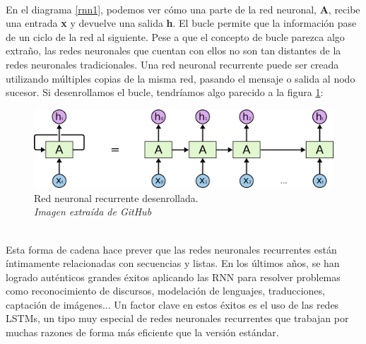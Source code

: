 \\En el diagrama \ref{rnn1}, podemos ver cómo una parte de la red neuronal, \textbf{A}, recibe una entrada \textbf{x} y devuelve una salida \textbf{h}. El bucle permite que la información pase de un ciclo de la red al siguiente. Pese a que el concepto de bucle parezca algo extraño, las redes neuronales que cuentan con ellos no son tan distantes de la redes neuronales tradicionales. Una red neuronal recurrente puede ser creada utilizando múltiples copias de la misma red, pasando el mensaje o salida al nodo sucesor. Si desenrollamos el bucle, tendríamos algo parecido a la figura \ref{rnn2}:\\
\begin{figure}[htp]
\centering
\vspace{-1.5em}
\includegraphics[scale=0.3]{images/RNNunrolled.png}
\caption{Red neuronal recurrente desenrollada.\\\textit{Imagen extraída de GitHub}}
\label{rnn2}
\end{figure}
\\Esta forma de cadena hace prever que las redes neuronales recurrentes están íntimamente relacionadas con secuencias y listas. En los últimos años, se han logrado auténticos grandes éxitos aplicando las RNN para resolver problemas como reconocimiento de discursos, modelación de lenguajes, traducciones, captación de imágenes... Un factor clave en estos éxitos es el uso de las redes LSTMs, un tipo muy especial de redes neuronales recurrentes que trabajan por muchas razones de forma más eficiente que la versión estándar.
